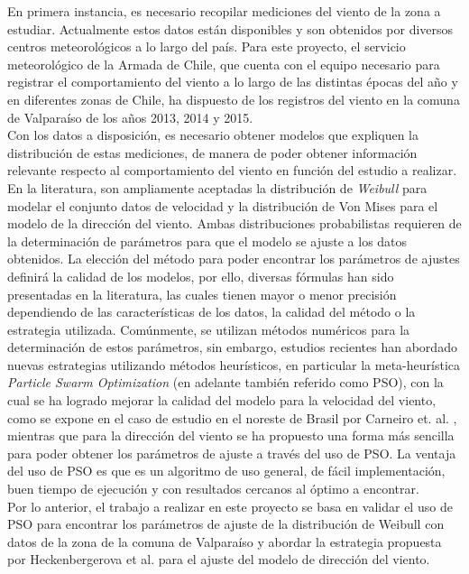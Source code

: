 En primera instancia, es necesario recopilar mediciones del viento de la zona a estudiar.
Actualmente estos datos están disponibles y son obtenidos por diversos centros meteorológicos a lo largo del país. Para este proyecto, el servicio meteorológico de la Armada de Chile, que cuenta con el equipo necesario para registrar el comportamiento del viento a lo largo de las distintas épocas del año y en diferentes zonas de Chile, ha dispuesto de los registros del viento en la comuna de Valparaíso de los años 2013, 2014 y 2015.\\
Con los datos a disposición, es necesario obtener modelos que expliquen la distribución de estas mediciones, de manera de poder obtener información relevante respecto al comportamiento del viento en función del estudio a realizar. \\ 
En la literatura, son ampliamente aceptadas la distribución de \emph{Weibull} para modelar el conjunto datos de velocidad y la distribución de Von Mises para el modelo de la dirección del viento. Ambas distribuciones probabilistas requieren de la determinación de parámetros para que el modelo se ajuste a los datos obtenidos. La elección del método para poder encontrar los parámetros de ajustes definirá la calidad de los modelos, por ello, diversas fórmulas han sido presentadas en la literatura, las cuales tienen mayor o menor precisión dependiendo de las características de los datos, la calidad del método o la estrategia utilizada. Comúnmente, se utilizan métodos numéricos para la determinación de estos parámetros, sin embargo, estudios recientes han abordado nuevas estrategias
utilizando métodos heurísticos, en particular la meta-heurística \emph{Particle Swarm Optimization} (en adelante también referido como PSO), con la cual se ha logrado mejorar la calidad del modelo para la velocidad del viento, como se expone en el caso de estudio en el noreste de Brasil por Carneiro et. al.  \cite{Carneiro15}, mientras que para la dirección del viento se ha propuesto una forma más sencilla para poder obtener los parámetros de ajuste a través del uso de PSO. La ventaja del uso de PSO es que es un algoritmo de uso general, de fácil implementación, buen tiempo de ejecución y con resultados cercanos al óptimo a encontrar.\\
Por lo anterior, el trabajo a realizar en este proyecto se basa en validar el uso de PSO para encontrar los parámetros de ajuste de la distribución de Weibull con datos de la zona de la comuna de Valparaíso y abordar la estrategia propuesta por Heckenbergerova et al.\cite{Heckenbergerova15} para el ajuste del modelo de dirección del viento.

